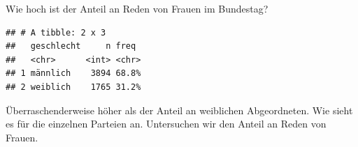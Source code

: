 \documentclass[oneside, 12pt, numbers=endperiod]{scrbook}
\newenvironment{Shaded}{\begin{snugshade}}{\end{snugshade}}
\newcommand{\DataTypeTok}[1]{\textcolor[rgb]{0.13,0.29,0.53}{#1}}
\newcommand{\DecValTok}[1]{\textcolor[rgb]{0.00,0.00,0.81}{#1}}
\newcommand{\KeywordTok}[1]{\textcolor[rgb]{0.13,0.29,0.53}{\textbf{#1}}}
\newcommand{\NormalTok}[1]{#1}
\newcommand{\OperatorTok}[1]{\textcolor[rgb]{0.81,0.36,0.00}{\textbf{#1}}}
\newcommand{\StringTok}[1]{\textcolor[rgb]{0.31,0.60,0.02}{#1}}
\theoremstyle{definition}
\theoremstyle{definition}
\theoremstyle{definition}
\theoremstyle{remark}
\begin{document}
Wie hoch ist der Anteil an Reden von Frauen im Bundestag?

\begin{Shaded}
\end{Shaded}

\begin{verbatim}
## # A tibble: 2 x 3
##   geschlecht     n freq 
##   <chr>      <int> <chr>
## 1 männlich    3894 68.8%
## 2 weiblich    1765 31.2%
\end{verbatim}

Überraschenderweise höher als der Anteil an weiblichen Abgeordneten. Wie
sieht es für die einzelnen Parteien an. Untersuchen wir den Anteil an
Reden von Frauen.
\end{document}

